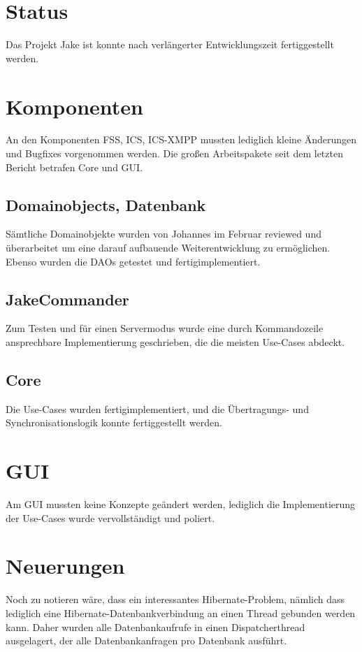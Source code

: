 \setcounter{chapter}{1}
\section{Status}
Das Projekt Jake ist konnte nach verlängerter Entwicklungszeit fertiggestellt werden.

\section{Komponenten}
An den Komponenten FSS, ICS, ICS-XMPP mussten lediglich kleine Änderungen und Bugfixes vorgenommen werden. 
Die großen Arbeitspakete seit dem letzten Bericht betrafen Core und GUI.

\subsection{Domainobjects, Datenbank}
Sämtliche Domainobjekte wurden von Johannes im Februar reviewed und überarbeitet um eine darauf aufbauende Weiterentwicklung zu ermöglichen. Ebenso wurden die DAOs getestet und fertigimplementiert. 

\subsection{JakeCommander}
Zum Testen und für einen Servermodus wurde eine durch Kommandozeile ansprechbare Implementierung geschrieben, die die meisten Use-Cases abdeckt.


\subsection{Core}
Die Use-Cases wurden fertigimplementiert, und die Übertragungs- und Synchronisationslogik konnte fertiggestellt werden.


\section{GUI}
Am GUI mussten keine Konzepte geändert werden, lediglich die Implementierung der Use-Cases wurde vervollständigt und poliert.


\section{Neuerungen}
Noch zu notieren wäre, dass ein interessantes Hibernate-Problem, nämlich dass lediglich eine Hibernate-Datenbankverbindung an einen Thread gebunden werden kann. Daher wurden alle Datenbankaufrufe in einen Dispatcherthread ausgelagert, der alle Datenbankanfragen pro Datenbank ausführt.

